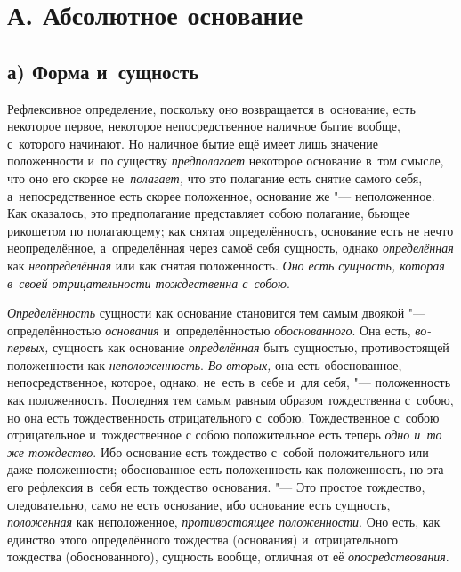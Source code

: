 \section[А. Абсолютное основание]{А. Абсолютное основание}

\subsection[а) Форма и~сущность]{а) Форма и~сущность}

Рефлексивное определение, поскольку оно возвращается в~основание, есть
некоторое первое, некоторое непосредственное наличное бытие вообще, с~которого
начинают. Но наличное бытие ещё имеет лишь значение положенности и~по существу
{\em предполагает} некоторое основание в~том смысле, что оно его скорее
не~{\em полагает,} что это полагание есть снятие самого себя,
а~непосредственное есть скорее положенное, основание же "--- неположенное. Как
оказалось, это предполагание представляет собою полагание, бьющее рикошетом по
полагающему; как снятая определённость, основание есть не нечто неопределённое,
а~определённая через самоё себя сущность, однако {\em определённая}
как {\em неопределённая} или как снятая положенность.
{\em Оно есть сущность, которая в~своей отрицательности тождественна с~собою}.

{\em Определённость} сущности как основание становится тем самым двоякой "---
определённостью {\em основания} и~определённостью {\em обоснованного}. Она
есть, {\em во-первых,} сущность как основание {\em определённая} быть
сущностью, противостоящей положенности как {\em неположенность}.
{\em Во-вторых,} она есть обоснованное, непосредственное, которое, однако,
не~есть в~себе и~для себя, "--- положенность как положенность. Последняя тем
самым равным образом тождественна с~собою, но она есть тождественность
отрицательного с~собою. Тождественное с~собою отрицательное и~тождественное с
собою положительное есть теперь {\em одно и~то же тождество}. Ибо основание
есть тождество с~собой положительного или даже положенности; обоснованное есть
положенность как положенность, но эта его рефлексия в~себя есть тождество
основания. "--- Это простое тождество, следовательно, само не есть основание,
ибо основание есть сущность, {\em положенная} как неположенное,
{\em противостоящее положенности}. Оно есть, как единство этого определённого
тождества (основания) и~отрицательного тождества (обоснованного), сущность
вообще, отличная от её {\em опосредствования}.

